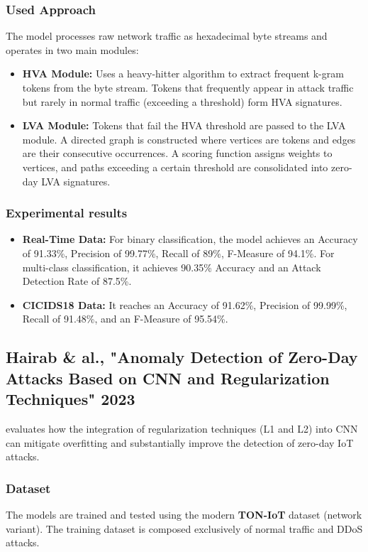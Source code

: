 \documentclass[12pt, a4paper]{report}
\begin{document}
\subsubsection{Used Approach}
The model processes raw network traffic as hexadecimal byte streams and operates in two main modules:
\begin{itemize}
    \item \textbf{HVA Module:} Uses a heavy-hitter algorithm to extract frequent k-gram tokens from the byte stream. Tokens that frequently appear in attack traffic but rarely in normal traffic (exceeding a threshold) form HVA signatures.
    \item \textbf{LVA Module:} Tokens that fail the HVA threshold are passed to the LVA module. A directed graph is constructed where vertices are tokens and edges are their consecutive occurrences. A scoring function assigns weights to vertices, and paths exceeding a certain threshold are consolidated into zero-day LVA signatures.
\end{itemize}

\subsubsection{Experimental results}
\begin{itemize}
    \item \textbf{Real-Time Data:} For binary classification, the model achieves an Accuracy of 91.33\%, Precision of 99.77\%, Recall of 89\%, F-Measure of 94.1\%. For multi-class classification, it achieves 90.35\% Accuracy and an Attack Detection Rate of 87.5\%.
    \item \textbf{CICIDS18 Data:} It reaches an Accuracy of 91.62\%, Precision of 99.99\%, Recall of 91.48\%, and an F-Measure of 95.54\%.
\end{itemize}



\subsection{Hairab \& al., "Anomaly Detection of Zero-Day Attacks Based on CNN and Regularization Techniques" 2023}
\cite{hairab2023anomaly} evaluates how the integration of regularization techniques (L1 and L2) into CNN can mitigate overfitting and substantially improve the detection of zero-day IoT attacks.

\subsubsection{Dataset}
The models are trained and tested using the modern \textbf{TON-IoT} dataset  (network variant). The training dataset is composed exclusively of normal traffic and DDoS attacks. 
\end{document}

